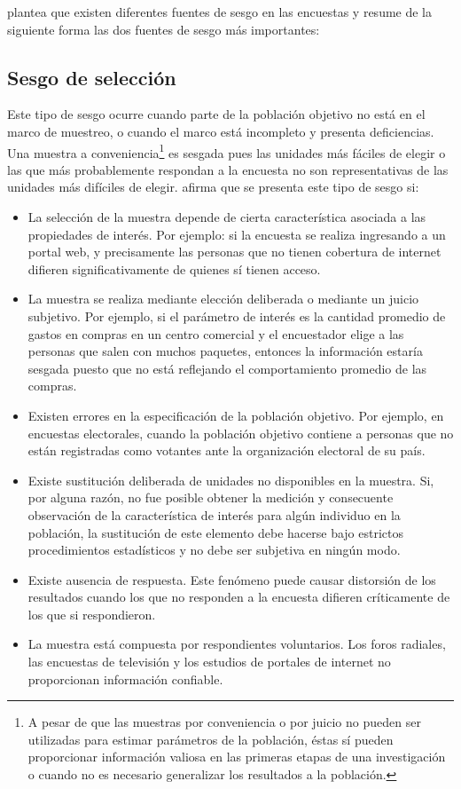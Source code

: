 \documentclass[
  12pt,
  spanish,
]{book}
\providecommand{\tightlist}{%
  \setlength{\itemsep}{0pt}\setlength{\parskip}{0pt}}
\begin{document}
\citet{Gutierrez_2016} plantea que existen diferentes fuentes de sesgo en las encuestas y resume de la siguiente forma las dos fuentes de sesgo más importantes:

\hypertarget{sesgo-de-selecciuxf3n}{%
\subsection{Sesgo de selección}\label{sesgo-de-selecciuxf3n}}

Este tipo de sesgo ocurre cuando parte de la población objetivo no está en el marco de muestreo, o cuando el marco está incompleto y presenta deficiencias. Una muestra a conveniencia\footnote{A pesar de que las muestras por conveniencia o por juicio no pueden ser utilizadas para estimar parámetros de la población, éstas sí pueden proporcionar información valiosa en las primeras etapas de una investigación o cuando no es necesario generalizar los resultados a la población.} es sesgada pues las unidades más fáciles de elegir o las que más probablemente respondan a la encuesta no son representativas de las unidades más difíciles de elegir. \citet{Loh} afirma que se presenta este tipo de sesgo si:

\begin{itemize}
\tightlist
\item
  La selección de la muestra depende de cierta característica asociada a las propiedades de interés. Por ejemplo: si la encuesta se realiza ingresando a un portal web, y precisamente las personas que no tienen cobertura de internet difieren significativamente de quienes sí tienen acceso.
\item
  La muestra se realiza mediante elección deliberada o mediante un juicio subjetivo. Por ejemplo, si el parámetro de interés es la cantidad promedio de gastos en compras en un centro comercial y el encuestador elige a las personas que salen con muchos paquetes, entonces la información estaría sesgada puesto que no está reflejando el comportamiento promedio de las compras.
\item
  Existen errores en la especificación de la población objetivo. Por ejemplo, en encuestas electorales, cuando la población objetivo contiene a personas que no están registradas como votantes ante la organización electoral de su país.
\item
  Existe sustitución deliberada de unidades no disponibles en la muestra. Si, por alguna razón, no fue posible obtener la medición y consecuente observación de la característica de interés para algún individuo en la población, la sustitución de este elemento debe hacerse bajo estrictos procedimientos estadísticos y no debe ser subjetiva en ningún modo.
\item
  Existe ausencia de respuesta. Este fenómeno puede causar distorsión de los resultados cuando los que no responden a la encuesta difieren críticamente de los que si respondieron.
\item
  La muestra está compuesta por respondientes voluntarios. Los foros radiales, las encuestas de televisión y los estudios de portales de internet no proporcionan información confiable.
\end{itemize}
\end{document}
